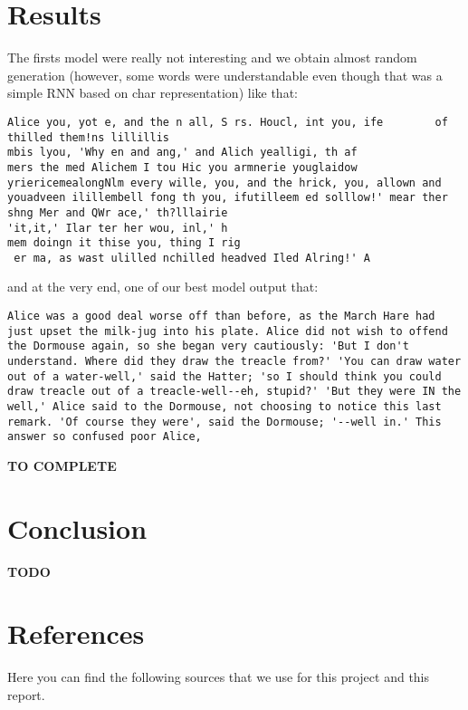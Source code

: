 \documentclass{article}
\begin{document}
\section{Results}

The firsts model were really not interesting and we obtain almost random generation (however, some words were understandable even though that was a simple RNN based on char representation) like that:
\begin{lstlisting}[breaklines]
Alice you, yot e, and the n all, S rs. Houcl, int you, ife        of thilled them!ns lillillis
mbis lyou, 'Why en and ang,' and Alich yealligi, th af
mers the med Alichem I tou Hic you armnerie youglaidow yriericemealongNlm every wille, you, and the hrick, you, allown and youadveen ilillembell fong th you, ifutilleem ed solllow!' mear ther shng Mer and QWr ace,' th?lllairie
'it,it,' Ilar ter her wou, inl,' h
mem doingn it thise you, thing I rig
 er ma, as wast ulilled nchilled headved Iled Alring!' A
\end{lstlisting}

and at the very end, one of our best model output that:
\begin{lstlisting}[breaklines]
    Alice was a good deal worse off than before, as the March Hare had just upset the milk-jug into his plate. Alice did not wish to offend the Dormouse again, so she began very cautiously: 'But I don't understand. Where did they draw the treacle from?' 'You can draw water out of a water-well,' said the Hatter; 'so I should think you could draw treacle out of a treacle-well--eh, stupid?' 'But they were IN the well,' Alice said to the Dormouse, not choosing to notice this last remark. 'Of course they were', said the Dormouse; '--well in.' This answer so confused poor Alice,
\end{lstlisting}

\textbf{TO COMPLETE}

\section{Conclusion}

\textbf{TODO}

\newpage

\section*{References}


Here you can find the following sources that we use for this project and this report.
\medskip
\end{document}
